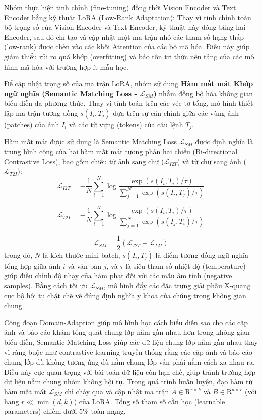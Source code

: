 Nhóm thực hiện tinh chỉnh (fine-tuning) đồng thời Vision Encoder và Text Encoder bằng kỹ thuật LoRA (Low-Rank Adaptation): 
Thay vì tinh chỉnh toàn bộ trọng số của Vision Encoder và Text Encoder, kỹ thuật này đóng băng hai Encoder, sau đó chỉ tạo và cập nhật một ma trận nhỏ các tham số hạng thấp (low-rank) được chèn vào các khối Attention của các bộ mã hóa. Điều này giúp giảm thiểu rủi ro quá khớp (overfitting) và bảo tồn tri thức nền tảng của các mô hình mã hóa với trường hợp ít mẫu học.
    
    Để cập nhật trọng số của ma trận LoRA, nhóm sử dụng \textbf{Hàm mất mát Khớp ngữ nghĩa (Semantic Matching Loss - $\mathcal{L}_{SM}$)} nhằm đồng bộ hóa không gian biểu diễn đa phương thức. Thay vì tính toán trên các véc-tơ tổng, mô hình thiết lập ma trận tương đồng $s(I_i, T_j)$ dựa trên sự căn chỉnh giữa các vùng ảnh (patches) của ảnh $I_i$ và các từ vựng (tokens) của câu lệnh $T_j$. 

    Hàm mất mát được sử dụng là Semantic Matching Loss $\mathcal{L}_{SM}$ được định nghĩa là trung bình cộng của hai hàm mất mát tương phản hai chiều (Bi-directional Contrastive Loss), bao gồm chiều từ ảnh sang chữ ($\mathcal{L}_{I2T}$) và từ chữ sang ảnh ($\mathcal{L}_{T2I}$):
    \begin{equation}
        \mathcal{L}_{I2T} = -\frac{1}{N} \sum_{i=1}^{N} \log \frac{\exp(s(I_i, T_i) / \tau)}{\sum_{j=1}^{N} \exp(s(I_i, T_j) / \tau)}
    \end{equation}

    \begin{equation}
        \mathcal{L}_{T2I} = -\frac{1}{N} \sum_{i=1}^{N} \log \frac{\exp(s(I_i, T_i) / \tau)}{\sum_{j=1}^{N} \exp(s(I_j, T_i) / \tau)}
    \end{equation}

    \begin{equation}
        \mathcal{L}_{SM} = \frac{1}{2} (\mathcal{L}_{I2T} + \mathcal{L}_{T2I})
    \end{equation}
    trong đó, $N$ là kích thước mini-batch, $s(I_i, T_j)$ là điểm tương đồng ngữ nghĩa tổng hợp giữa ảnh $i$ 
    và văn bản $j$, và $\tau$ là siêu tham số nhiệt độ (temperature) giúp điều chỉnh độ nhạy của hàm phạt đối với 
    các mẫu âm tính (negative samples). Bằng cách tối ưu $\mathcal{L}_{SM}$, 
    mô hình đẩy các đặc trưng giải phẫu X-quang cục bộ hội tụ chặt chẽ về đúng định nghĩa y khoa của chúng 
    trong không gian chung.

Công đoạn Domain-Adaption giúp mô hình học cách biểu diễn sao cho các cặp ảnh và báo cáo khám tổng quát chung lớp nằm gần nhau hơn trong không gian biểu diễn, 
Semantic Matching Loss giúp các dữ liệu chung lớp nằm gần nhau thay vì ràng buộc như contrastive learning truyền thống rằng 
các cặp ảnh và báo cáo chung lớp dù không tương ứng dù nằm chung lớp vẫn phải nằm cách xa nhau ra. 
Điều này cực quan trọng với bài toán dữ liệu còn hạn chế, giúp tránh trường hợp dữ liệu nằm chung nhóm không hội tụ. 
Trong quá trình huấn luyện, đạo hàm từ hàm mất mát $\mathcal{L}_{SM}$ chỉ chảy qua và cập nhật ma trận 
$A \in \mathrm{R}^{r \times k}$ và $B \in \mathrm{R}^{d \times r}$ (với hạng $r \ll \min(d, k)$) của LoRA. 
Tổng số tham số cần học (learnable parameters) chiếm dưới 5\% toàn mạng.


